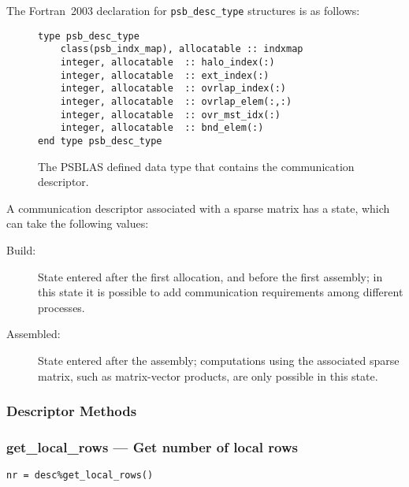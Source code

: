 The Fortran~2003 declaration  for \verb|psb_desc_type| structures is 
as follows:
\begin{figure}[h!]
\begin{center}
    \begin{minipage}[tl]{0.9\textwidth}
\begin{verbatim} 
type psb_desc_type 
    class(psb_indx_map), allocatable :: indxmap
    integer, allocatable  :: halo_index(:)
    integer, allocatable  :: ext_index(:)
    integer, allocatable  :: ovrlap_index(:)
    integer, allocatable  :: ovrlap_elem(:,:)
    integer, allocatable  :: ovr_mst_idx(:)
    integer, allocatable  :: bnd_elem(:)
end type psb_desc_type 
\end{verbatim}
    \end{minipage}
  \end{center}
  \caption{\label{fig:desctype}The PSBLAS defined data type that
    contains the communication descriptor.}
\end{figure}

A communication descriptor associated with a sparse  matrix has a
state, which can take the following values:
\begin{description}
\item[Build:] State entered after the first allocation, and before the
  first assembly; in this state it is possible to add communication
  requirements among different processes. 
\item[Assembled:] State entered after the assembly; computations using
  the associated sparse matrix, such as matrix-vector products, are
  only possible   in this state.
\end{description}

\subsubsection{Descriptor Methods} 

\subsubsection*{get\_local\_rows --- Get number of local rows}

\begin{verbatim}
nr = desc%get_local_rows()
\end{verbatim}

